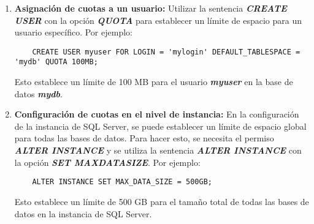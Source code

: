\begin{enumerate}
  \item \textbf{Asignación de cuotas a un usuario:} Utilizar la sentencia \textbf{\emph{CREATE USER}} con la opción \textbf{\emph{QUOTA}} para establecer un límite de espacio para un usuario específico. Por ejemplo:

  \begin{lstlisting}
    CREATE USER myuser FOR LOGIN = 'mylogin' DEFAULT_TABLESPACE = 'mydb' QUOTA 100MB;
  \end{lstlisting}

  Esto establece un límite de 100 MB para el usuario \textbf{\emph{myuser}} en la base de datos \textbf{\emph{mydb}}.

  \item \textbf{Configuración de cuotas en el nivel de instancia:} En la configuración de la instancia de SQL Server, se puede establecer un límite de espacio global para todas las bases de datos. Para hacer esto, se necesita el permiso \textbf{\emph{ALTER INSTANCE}} y se utiliza la sentencia \textbf{\emph{ALTER INSTANCE}} con la opción \textbf{\emph{SET MAX{\textunderscore}DATA{\textunderscore}SIZE}}. Por ejemplo:
  
  \begin{lstlisting}
    ALTER INSTANCE SET MAX_DATA_SIZE = 500GB;
  \end{lstlisting}

  Esto establece un límite de 500 GB para el tamaño total de todas las bases de datos en la instancia de SQL Server.
\end{enumerate}